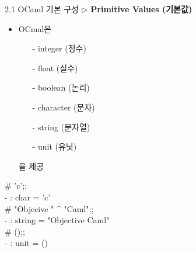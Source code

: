 \documentclass[10pt]{beamer}
\begin{document}
	\begin{frame}{2.1 OCaml 기본 구성}
		\textbf{$\triangleright$ Primitive Values (기본값)}
		
		\begin{itemize}
			\item OCmal은 \begin{itemize}
				\item[-] integer (정수) 
				\item[-] float (실수)
				\item[-] boolean (논리)
				\item[-] character (문자)
				\item[-] string (문자열)
				\item[-] unit (유닛)
			\end{itemize}을 제공
		\end{itemize}
		\begin{tcolorbox}[colback=backcolor]\ttfamily
			\# 'c';; \\
			- : char = 'c'\\
			\# "Objecive " \^{} "Caml";; \\
			- : string = "Objective Caml"\\
			\# ();;\\
			- : unit = ()
		\end{tcolorbox}
	\end{frame}
\end{document}
